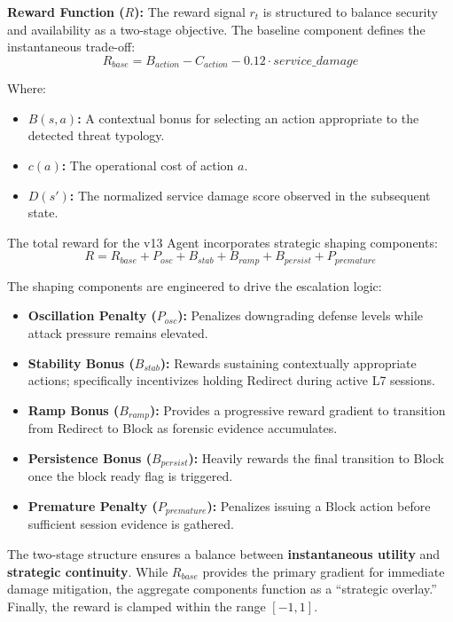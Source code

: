 \documentclass[12pt,a4paper]{report}
\begin{document}
\textbf{Reward Function ($R$):} The reward signal $r_t$ is structured to balance security and availability as a two-stage objective. The baseline component defines the instantaneous trade-off:
\begin{equation}
R_{base} = B_{action} - C_{action} - 0.12 \cdot service\_damage
\end{equation}

Where:
\begin{itemize}
    \item \textbf{$B(s, a)$:} A contextual bonus for selecting an action appropriate to the detected threat typology.
    \item \textbf{$c(a)$:} The operational cost of action $a$.
    \item \textbf{$D(s')$:} The normalized service damage score observed in the subsequent state.
\end{itemize}

The total reward for the v13 Agent incorporates strategic shaping components:
\begin{equation}
R = R_{base} + P_{osc} + B_{stab} + B_{ramp} + B_{persist} + P_{premature}
\end{equation}

The shaping components are engineered to drive the escalation logic:
\begin{itemize}
    \item \textbf{Oscillation Penalty ($P_{osc}$):} Penalizes downgrading defense levels while attack pressure remains elevated.
    \item \textbf{Stability Bonus ($B_{stab}$):} Rewards sustaining contextually appropriate actions; specifically incentivizes holding Redirect during active L7 sessions.
    \item \textbf{Ramp Bonus ($B_{ramp}$):} Provides a progressive reward gradient to transition from Redirect to Block as forensic evidence accumulates.
    \item \textbf{Persistence Bonus ($B_{persist}$):} Heavily rewards the final transition to Block once the block ready flag is triggered.
    \item \textbf{Premature Penalty ($P_{premature}$):} Penalizes issuing a Block action before sufficient session evidence is gathered.
\end{itemize}

The two-stage structure ensures a balance between \textbf{instantaneous utility} and \textbf{strategic continuity}. While $R_{base}$ provides the primary gradient for immediate damage mitigation, the aggregate components function as a ``strategic overlay.'' Finally, the reward is clamped within the range $[-1, 1]$.
\end{document}
